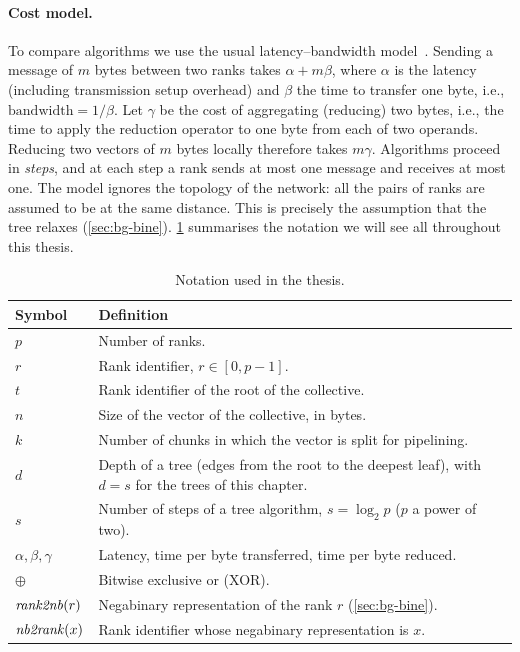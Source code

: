 \paragraph{Cost model.}
To compare algorithms we use the usual latency--bandwidth model~\cite{hockney1994communication,thakur2005optimization}.
Sending a message of $m$ bytes between two ranks takes $\alpha+m\beta$, where $\alpha$ is the latency (including transmission setup overhead) and $\beta$ the time to transfer one byte, i.e., $\mathrm{bandwidth} = 1/\beta$.
Let $\gamma$ be the cost of aggregating (reducing) two bytes, i.e., the time to apply the reduction operator to one byte from each of two operands. Reducing two vectors of $m$ bytes locally therefore takes $m\gamma$.
Algorithms proceed in \emph{steps}, and at each step a rank sends at most one message and receives at most one.
The model ignores the topology of the network: all the pairs of ranks are assumed to be at the same distance.
This is precisely the assumption that the \bine{} tree relaxes (\cref{sec:bg-bine}).
\cref{tab:notation} summarises the notation we will see all throughout this thesis.

\begin{table}[t]
\centering
\small
\caption{Notation used in the thesis.}
\label{tab:notation}
\begin{tabularx}{\linewidth}{@{}lX@{}}
\toprule
Symbol & Definition \\
\midrule
$p$ & Number of ranks. \\
$r$ & Rank identifier, $r\in[0,p-1]$. \\
$t$ & Rank identifier of the root of the collective. \\
$n$ & Size of the vector of the collective, in bytes. \\
$k$ & Number of chunks in which the vector is split for pipelining. \\
$d$ & Depth of a tree (edges from the root to the deepest leaf), with $d=s$ for the trees of this chapter. \\
$s$ & Number of steps of a tree algorithm, $s=\log_2 p$ ($p$ a power of two). \\
$\alpha,\beta,\gamma$ & Latency, time per byte transferred, time per byte reduced. \\
$\oplus$ & Bitwise exclusive or (XOR). \\
$\mathit{rank2nb}(r)$ & Negabinary representation of the rank $r$ (\cref{sec:bg-bine}). \\
$\mathit{nb2rank}(x)$ & Rank identifier whose negabinary representation is $x$. \\
\bottomrule
\end{tabularx}
\end{table}

